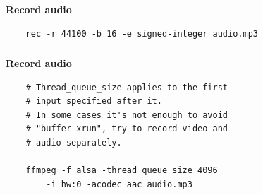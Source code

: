 \documentclass[usenames,dvipsnames, 18pt, compress, aspectratio=169]{beamer}
\begin{document}
\begin{frame}[fragile]{}
    \frametitle{}
    \begin{center}
        \textbf{Record audio}
        \vspace{0.2cm}

        \begin{verbatim}
    rec -r 44100 -b 16 -e signed-integer audio.mp3
        \end{verbatim}

    \end{center}
\end{frame}

\begin{frame}[fragile]{}
    \frametitle{}
    \begin{center}
        \textbf{Record audio}
        \vspace{0.2cm}

        \begin{verbatim}
    # Thread_queue_size applies to the first
    # input specified after it.
    # In some cases it's not enough to avoid
    # "buffer xrun", try to record video and
    # audio separately.

    ffmpeg -f alsa -thread_queue_size 4096
        -i hw:0 -acodec aac audio.mp3
        \end{verbatim}

    \end{center}
\end{frame}
\end{document}
